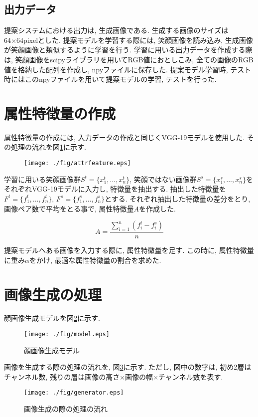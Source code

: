\subsection{出力データ}
提案システムにおける出力は, 生成画像である. 生成する画像のサイズは64×64pixelとした. 提案モデルを学習する際には, 笑顔画像を読み込み, 生成画像が笑顔画像と類似するように学習を行う. 学習に用いる出力データを作成する際は, 笑顔画像をscipyライブラリを用いてRGB値におとしこみ, 全ての画像のRGB値を格納した配列を作成し, npyファイルに保存した. 提案モデル学習時, テスト時にはこのnpyファイルを用いて提案モデルの学習, テストを行った. 

\section{属性特徴量の作成}
属性特徴量の作成には, 入力データの作成と同じくVGG-19モデルを使用した. その処理の流れを図\ref{fig:attrfeature}に示す. 

\begin{figure}[H]
 	\begin{center}
 		\texttt{[image: ./fig/attrfeature.eps]}
 		\caption{}
 		\label{fig:attrfeature}
 	\end{center}
\end{figure}

学習に用いる笑顔画像群$S^t = \{x^t_{1}, ..., x^t_{n}\}$, 笑顔ではない画像群$S^s = \{x^s_{1}, ..., x^s_{n}\}$をそれぞれVGG-19モデルに入力し, 特徴量を抽出する. 抽出した特徴量を$F^t = \{f^t_{1}, ..., f^t_{n}\}$, $F^s = \{f^s_{1}, ..., f^s_{n}\}$とする. それぞれ抽出した特徴量の差分をとり, 画像ペア数で平均をとる事で, 属性特徴量$A$を作成した. 

\begin{equation}
  A = \frac{\sum^{n}_{i=1}(f^t_{i} - f^s_{i})}{n}
\end{equation}

提案モデルへある画像を入力する際に, 属性特徴量を足す. この時に, 属性特徴量に重み$\alpha$をかけ, 最適な属性特徴量の割合を求めた.  

\section{画像生成の処理}
顔画像生成モデルを図\ref{fig:model}に示す. 
\begin{figure}[H]
 	\begin{center}
 		\texttt{[image: ./fig/model.eps]}
 		\caption{顔画像生成モデル}
 		\label{fig:model}
 	\end{center}
 \end{figure}
画像を生成する際の処理の流れを, 図\ref{fig:generator}に示す. ただし, 図中の数字は, 初め2層はチャンネル数, 残りの層は画像の高さ×画像の幅×チャンネル数を表す. 
\begin{figure}[H]
 	\begin{center}
 		\texttt{[image: ./fig/generator.eps]}
 		\caption{画像生成の際の処理の流れ}
 		\label{fig:generator}
 	\end{center}
 \end{figure}
 
